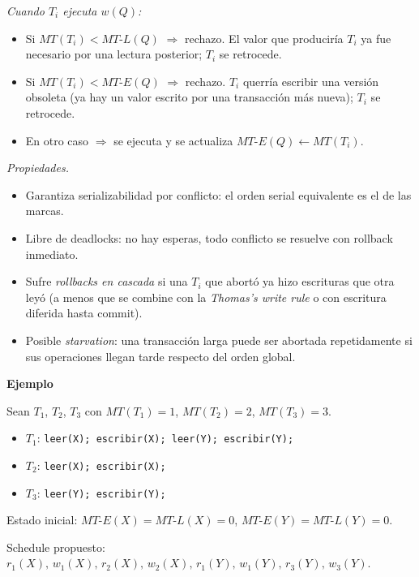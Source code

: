 \documentclass[11pt,a4paper]{article}
\newcommand{\itemcabecera}[1]{\noindent\textbf{#1}\par\medskip}
\newcommand{\bloqueEjemplo}{\itemcabecera{Ejemplo}}
\begin{document}
\textit{Cuando $T_i$ ejecuta $w(Q)$:}
\begin{itemize}
    \item Si $MT(T_i) < MT\text{-}L(Q)$ $\Rightarrow$ rechazo. El valor que produciría $T_i$ ya fue necesario por una lectura posterior; $T_i$ se retrocede.
    \item Si $MT(T_i) < MT\text{-}E(Q)$ $\Rightarrow$ rechazo. $T_i$ querría escribir una versión obsoleta (ya hay un valor escrito por una transacción más nueva); $T_i$ se retrocede.
    \item En otro caso $\Rightarrow$ se ejecuta y se actualiza $MT\text{-}E(Q) \gets MT(T_i)$.
\end{itemize}

\textit{Propiedades.}

\begin{itemize}
    \item Garantiza serializabilidad por conflicto: el orden serial equivalente es el de las marcas.
    \item Libre de deadlocks: no hay esperas, todo conflicto se resuelve con rollback inmediato.
    \item Sufre \emph{rollbacks en cascada} si una $T_i$ que abortó ya hizo escrituras que otra leyó (a menos que se combine con la \emph{Thomas's write rule} o con escritura diferida hasta commit).
    \item Posible \emph{starvation}: una transacción larga puede ser abortada repetidamente si sus operaciones llegan tarde respecto del orden global.
\end{itemize}

\bloqueEjemplo

Sean $T_1$, $T_2$, $T_3$ con $MT(T_1)=1$, $MT(T_2)=2$, $MT(T_3)=3$.

\begin{itemize}
    \item $T_1$: \texttt{leer(X); escribir(X); leer(Y); escribir(Y);}
    \item $T_2$: \texttt{leer(X); escribir(X);}
    \item $T_3$: \texttt{leer(Y); escribir(Y);}
\end{itemize}

Estado inicial: $MT\text{-}E(X) = MT\text{-}L(X) = 0$, $MT\text{-}E(Y) = MT\text{-}L(Y) = 0$.

Schedule propuesto: $r_1(X),\, w_1(X),\, r_2(X),\, w_2(X),\, r_1(Y),\, w_1(Y),\, r_3(Y),\, w_3(Y)$.
\end{document}
